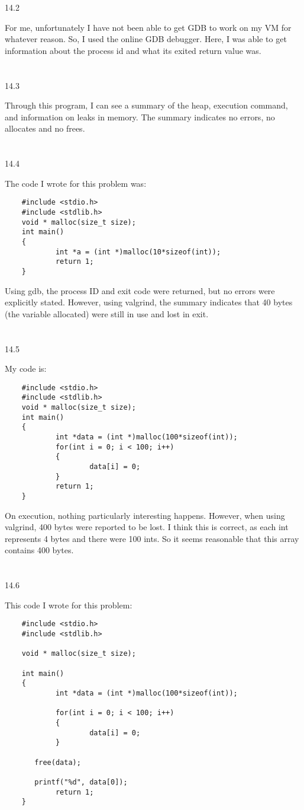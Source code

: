 \documentclass[12pt, a4paper]{article}
\begin{document}
	
14.2

	For me, unfortunately I have not been able to get GDB to work on my VM for whatever reason. So, I used the online GDB debugger. Here, I was able to get information about the process id and what its exited return value was. \\ \\ \\	

14.3

	Through this program, I can see a summary of the heap, execution command, and information on leaks in memory. The summary indicates no errors, no allocates and no frees. \\ \\ \\
	
14.4

	The code I wrote for this problem was:
	\begin{verbatim}
	#include <stdio.h>
	#include <stdlib.h>
	void * malloc(size_t size);
	int main()
	{
	        int *a = (int *)malloc(10*sizeof(int));
	        return 1;
	}
	\end{verbatim}

	Using gdb, the process ID and exit code were returned, but no errors were explicitly stated.
	However, using valgrind, the summary indicates that 40 bytes (the variable allocated) were still in use and lost in exit. \\ \\ \\
	
14.5
	
	My code is:
	\begin{verbatim}
	#include <stdio.h>
	#include <stdlib.h>
	void * malloc(size_t size);
	int main()
	{
	        int *data = (int *)malloc(100*sizeof(int));
	        for(int i = 0; i < 100; i++)
	        {
	                data[i] = 0;
	        }	
	        return 1;
	}
	\end{verbatim}
	
	On execution, nothing particularly interesting happens. However, when using valgrind, 400 bytes were reported to be lost.
	I think this is correct, as each int represents 4 bytes and there were 100 ints. So it seems reasonable that this array contains 400 bytes.\\ \\ \\

14.6

	This code I wrote for this problem:
	\begin{verbatim}
	#include <stdio.h>
	#include <stdlib.h>
	
	void * malloc(size_t size);
	
	int main()
	{
	        int *data = (int *)malloc(100*sizeof(int));
	
	        for(int i = 0; i < 100; i++)
	        {       
	                data[i] = 0;
	        }
	
	   free(data);
	
	   printf("%d", data[0]);
	        return 1;
	}
	\end{verbatim}
	
\end{document}

